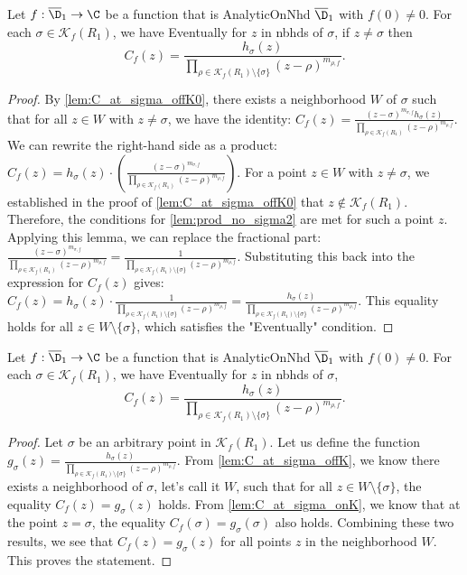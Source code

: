 \begin{lemma}[C off K]\label{lem:C_at_sigma_offK} \leanok {}
Let $f:\overline{\D}_1\to\C$ be a function that is AnalyticOnNhd $\overline{\D}_1$ with $f(0)\neq0$. For each $\sigma \in \mathcal{K}_f(R_1)$, we have Eventually for $z$ in nbhds of $\sigma$, if $z\neq\sigma$ then
\[C_f(z) = \frac{h_\sigma(z)}{\prod_{\rho\in\mathcal{K}_f(R_1) \setminus\{\sigma\}}(z-\rho)^{m_{\rho,f}}}.\]
\end{lemma}
\begin{proof}
\leanok
By \cref{lem:C_at_sigma_offK0}, there exists a neighborhood $W$ of $\sigma$ such that for all $z \in W$ with $z \neq \sigma$, we have the identity:
$C_f(z) = \frac{(z-\sigma)^{m_{\sigma,f}} h_\sigma(z)}{\prod_{\rho\in\mathcal{K}_f(R_1)}(z-\rho)^{m_{\rho,f}}}$.
We can rewrite the right-hand side as a product:
$C_f(z) = h_\sigma(z) \cdot \left( \frac{(z-\sigma)^{m_{\sigma,f}}}{\prod_{\rho\in\mathcal{K}_f(R_1)}(z-\rho)^{m_{\rho,f}}} \right)$.
For a point $z \in W$ with $z \neq \sigma$, we established in the proof of \cref{lem:C_at_sigma_offK0} that $z \notin \mathcal{K}_f(R_1)$.
Therefore, the conditions for \cref{lem:prod_no_sigma2} are met for such a point $z$. Applying this lemma, we can replace the fractional part:
$\frac{(z-\sigma)^{m_{\sigma,f}}}{\prod_{\rho\in\mathcal{K}_f(R_1)}(z-\rho)^{m_{\rho,f}}} = \frac{1}{\prod_{\rho\in\mathcal{K}_f(R_1) \setminus\{\sigma\}}(z-\rho)^{m_{\rho,f}}}$.
Substituting this back into the expression for $C_f(z)$ gives:
$C_f(z) = h_\sigma(z) \cdot \frac{1}{\prod_{\rho\in\mathcal{K}_f(R_1) \setminus\{\sigma\}}(z-\rho)^{m_{\rho,f}}} = \frac{h_\sigma(z)}{\prod_{\rho\in\mathcal{K}_f(R_1) \setminus\{\sigma\}}(z-\rho)^{m_{\rho,f}}}$.
This equality holds for all $z \in W \setminus \{\sigma\}$, which satisfies the "Eventually" condition.
\end{proof}

\begin{lemma}\label{lem:C_at_sigma} \leanok {}
Let $f:\overline{\D}_1\to\C$ be a function that is AnalyticOnNhd $\overline{\D}_1$ with $f(0)\neq0$. For each $\sigma \in \mathcal{K}_f(R_1)$, we have Eventually for $z$ in nbhds of $\sigma$,
\[C_f(z) = \frac{h_\sigma(z)}{\prod_{\rho\in\mathcal{K}_f(R_1) \setminus\{\sigma\}}(z-\rho)^{m_{\rho,f}}}.\]
\end{lemma}
\begin{proof}
\leanok
Let $\sigma$ be an arbitrary point in $\mathcal{K}_f(R_1)$. Let us define the function $g_\sigma(z) = \frac{h_\sigma(z)}{\prod_{\rho\in\mathcal{K}_f(R_1) \setminus\{\sigma\}}(z-\rho)^{m_{\rho,f}}}$.
From \cref{lem:C_at_sigma_offK}, we know there exists a neighborhood of $\sigma$, let's call it $W$, such that for all $z \in W \setminus \{\sigma\}$, the equality $C_f(z) = g_\sigma(z)$ holds.
From \cref{lem:C_at_sigma_onK}, we know that at the point $z=\sigma$, the equality $C_f(\sigma) = g_\sigma(\sigma)$ also holds.
Combining these two results, we see that $C_f(z) = g_\sigma(z)$ for all points $z$ in the neighborhood $W$. This proves the statement.
\end{proof}



